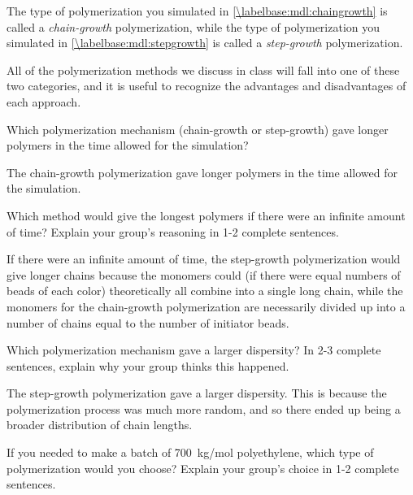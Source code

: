 \begin{activity}
\begin{ctqs}
\end{ctqs}

\begin{infobox}
	The type of polymerization you simulated in \ref{\labelbase:mdl:chaingrowth} is called a \emph{chain-growth} polymerization, while the type of polymerization you simulated in  \ref{\labelbase:mdl:stepgrowth} is called a \emph{step-growth} polymerization.
	
	All of the polymerization methods we discuss in class will fall into one of these two categories, and it is useful to recognize the advantages and disadvantages of each approach.
\end{infobox}

\begin{ctqs}
	\question Which polymerization mechanism (chain-growth or step-growth) gave longer polymers in the time allowed for the simulation?
	
		\begin{solution}[1in]
			The chain-growth polymerization gave longer polymers in the time allowed for the simulation.
		\end{solution}
	
	\question Which method would give the longest polymers if there were an infinite amount of time?  Explain your group's reasoning in 1-2 complete sentences.
	
		\begin{solution}[1.75in]
			If there were an infinite amount of time, the step-growth polymerization would give longer chains because the monomers could (if there were equal numbers of beads of each color) theoretically all combine into a single long chain, while the monomers for the chain-growth polymerization are necessarily divided up into a number of chains equal to the number of initiator beads.
		\end{solution}
	
	\question Which polymerization mechanism gave a larger dispersity?  In 2-3 complete sentences, explain why your group thinks this happened.
	
		\begin{solution}[1.75in]
			The step-growth polymerization gave a larger dispersity.  This is because the polymerization process was much more random, and so there ended up being a broader distribution of chain lengths.
		\end{solution}
	
	\question If you needed to make a batch of 700~kg/mol polyethylene, which type of polymerization would you choose?  Explain your group's choice in 1-2 complete sentences.
	

\end{ctqs}
\end{activity}
